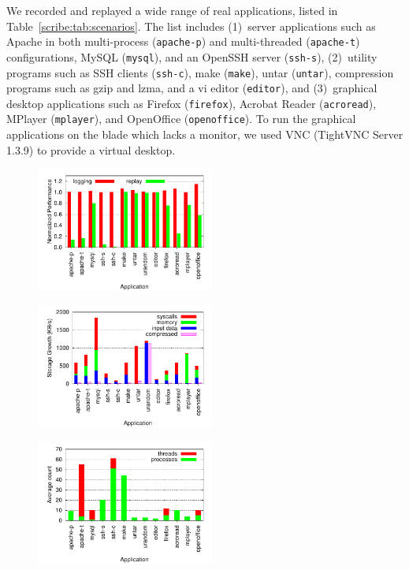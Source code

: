 We recorded and replayed a wide range of real applications, 
listed in
Table~\ref{scribe:tab:scenarios}.  The list includes (1)~server applications
such as Apache in both multi-process ({\tt apache-p}) and multi-threaded
({\tt apache-t}) configurations, MySQL ({\tt mysql}), and an
OpenSSH server ({\tt ssh-s}), (2)~utility programs such as
SSH clients ({\tt ssh-c}), make ({\tt make}), untar ({\tt untar}),
compression programs such as gzip and lzma, and a vi editor
({\tt editor}), and (3)~graphical desktop applications such as
Firefox ({\tt firefox}), Acrobat Reader ({\tt acroread}), MPlayer
({\tt mplayer}), and OpenOffice ({\tt openoffice}). To run the graphical
applications on the blade which lacks a monitor, we used VNC
(TightVNC Server 1.3.9) to provide a virtual desktop. 

\begin{figure}[t]
  \begin{minipage}[b]{0.33\linewidth}
    \centering
    \includegraphics[width=2.3in]{figures/scribe/overhead}
    \vskip -0.21in
    \vskip 0.3in
    \label{scribe:fig:overhead}
  \end{minipage}
  \begin{minipage}[b]{0.33\linewidth}
    \centering
    \includegraphics[width=2.3in]{figures/scribe/storage}
    \vskip -0.21in
    \vskip 0.3in
    \label{scribe:fig:storage}
  \end{minipage}
  \begin{minipage}[b]{0.33\linewidth}
    \centering
    \includegraphics[width=2.3in]{figures/scribe/totals}
    \vskip -0.21in
    \vskip 0.3in
    \label{scribe:fig:totals}
  \end{minipage}
  \vskip -0.35in
  \end{figure}
